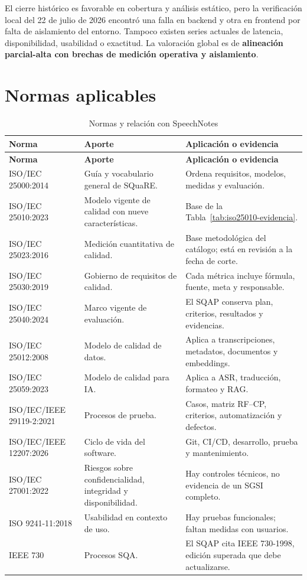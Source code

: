 El cierre histórico es favorable en cobertura y análisis estático, pero la
verificación local del 22 de julio de 2026 encontró una falla en backend y otra
en frontend por falta de aislamiento del entorno. Tampoco existen series actuales
de latencia, disponibilidad, usabilidad o exactitud. La valoración global es de
\textbf{alineación parcial-alta con brechas de medición operativa y aislamiento}.

\section{Normas aplicables}

\begin{longtable}{p{3.4cm}p{5cm}p{6.2cm}}
\caption{Normas y relación con SpeechNotes}
\label{tab:normas-iso-speechnotes}\\
\toprule
\textbf{Norma} & \textbf{Aporte} & \textbf{Aplicación o evidencia}\\
\midrule
\endfirsthead
\toprule
\textbf{Norma} & \textbf{Aporte} & \textbf{Aplicación o evidencia}\\
\midrule
\endhead
\bottomrule
\endfoot
ISO/IEC 25000:2014 & Guía y vocabulario general de SQuaRE. & Ordena requisitos, modelos, medidas y evaluación.\\
ISO/IEC 25010:2023 & Modelo vigente de calidad con nueve características. & Base de la Tabla~\ref{tab:iso25010-evidencia}.\\
ISO/IEC 25023:2016 & Medición cuantitativa de calidad. & Base metodológica del catálogo; está en revisión a la fecha de corte.\\
ISO/IEC 25030:2019 & Gobierno de requisitos de calidad. & Cada métrica incluye fórmula, fuente, meta y responsable.\\
ISO/IEC 25040:2024 & Marco vigente de evaluación. & El SQAP conserva plan, criterios, resultados y evidencias.\\
ISO/IEC 25012:2008 & Modelo de calidad de datos. & Aplica a transcripciones, metadatos, documentos y embeddings.\\
ISO/IEC 25059:2023 & Modelo de calidad para IA. & Aplica a ASR, traducción, formateo y RAG.\\
ISO/IEC/IEEE 29119-2:2021 & Procesos de prueba. & Casos, matriz RF--CP, criterios, automatización y defectos.\\
ISO/IEC/IEEE 12207:2026 & Ciclo de vida del software. & Git, CI/CD, desarrollo, prueba y mantenimiento.\\
ISO/IEC 27001:2022 & Riesgos sobre confidencialidad, integridad y disponibilidad. & Hay controles técnicos, no evidencia de un SGSI completo.\\
ISO 9241-11:2018 & Usabilidad en contexto de uso. & Hay pruebas funcionales; faltan medidas con usuarios.\\
IEEE 730 & Procesos SQA. & El SQAP cita IEEE 730-1998, edición superada que debe actualizarse.\\
\end{longtable}

